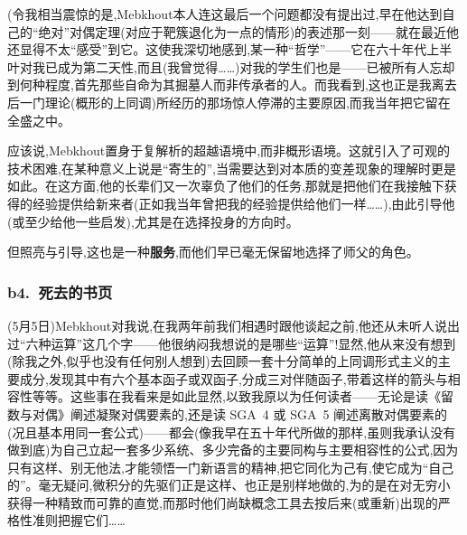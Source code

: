 \dmark{}(令我相当震惊的是,Mebkhout本人连这最后一个问题都没有提出过,早在他达到自己的“绝对”对偶定理(对应于靶簇退化为一点的情形)的表述那一刻——就在最近他还显得不太“感受”到它。这使我深切地感到,某一种“哲学”——它在六十年代上半叶对我已成为第二天性,而且(我曾觉得……)对我的学生们也是——已被所有人忘却到何种程度,首先那些自命为其掘墓人而非传承者的人。而我看到,这也正是我离去后一门理论(概形的上同调)所经历的那场惊人停滞的主要原因,而我当年把它留在全盛之中。

\noindent 应该说,Mebkhout置身于复解析的超越语境中,而非概形语境。这就引入了可观的技术困难,在某种意义上说是“寄生的”,当需要达到对本质的变差现象的理解时更是如此。在这方面,他的长辈们又一次辜负了他们的任务,那就是把他们在我接触下获得的经验提供给新来者(正如我当年曾把我的经验提供给他们一样……),由此引导他(或至少给他一些启发),尤其是在选择投身的方向时。

\noindent 但照亮与引导,这也是一种\textbf{服务},而他们早已毫无保留地选择了师父的角色。

\subsubsection*{b4.~死去的书页}



\noindent (5月5日)Mebkhout对我说,在我两年前我们相遇时跟他谈起之前,他还从未听人说出过“六种运算”这几个字——他很纳闷我想说的是哪些“运算”!显然,他从来没有想到(除我之外,似乎也没有任何别人想到)去回顾一套十分简单的上同调形式主义的主要成分,发现其中有六个基本函子或双函子,分成三对伴随函子,带着这样的箭头与相容性等等。这些事在我看来是如此显然,以致我原以为任何读者——无论\dmark{}是读《留数与对偶》阐述凝聚对偶要素的,还是读 SGA~4 或 SGA~5 阐述离散对偶要素的(况且基本用同一套公式)——都会(像我早在五十年代所做的那样,虽则我承认没有做到底)为自己立起一套多少系统、多少完备的主要同构与主要相容性的公式,因为只有这样、别无他法,才能领悟一门新语言的精神,把它同化为己有,使它成为“自己的”。毫无疑问,微积分的先驱们正是这样、也正是别样地做的,为的是在对无穷小获得一种精致而可靠的直觉,而那时他们尚缺概念工具去按后来(或重新)出现的严格性准则把握它们……


